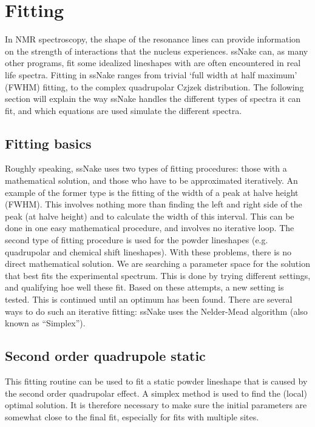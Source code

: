 \documentclass[11pt,a4paper]{article}
\begin{document}
\section{Fitting}
In NMR spectroscopy, the shape of the resonance lines can provide information on the strength of interactions that the nucleus experiences. ssNake can, as many other programs, fit some idealized lineshapes with are often encountered in real life spectra. Fitting in ssNake ranges from trivial `full width at half maximum' (FWHM) fitting, to the complex quadrupolar Czjzek distribution. The following section will explain the way ssNake handles the different types of spectra it can fit, and which equations are used simulate the different spectra.

\subsection{Fitting basics}
Roughly speaking, ssNake uses two types of fitting procedures: those with a mathematical solution, and those who have to be approximated iteratively. An example of the former type is the fitting of the width of a peak at halve height (FWHM). This involves nothing more than finding the left and right side of the peak (at halve height) and to calculate the width of this interval. This can be done in one easy mathematical procedure, and involves no iterative loop. The second type of fitting procedure is used for the powder lineshapes (e.g. quadrupolar and chemical shift lineshapes). With these problems, there is no direct mathematical solution. We are searching a parameter space for the solution that best fits the experimental spectrum. This is done by trying different settings, and qualifying hoe well these fit. Based on these attempts, a new setting is tested. This is continued until an optimum has been found. There are several ways to do such an iterative fitting: ssNake uses the Nelder-Mead algorithm \cite{nelder1965simplex} (also known as ``Simplex'').







\subsection{Second order quadrupole static}
This fitting routine can be used to fit a static powder lineshape that is caused by the second order quadrupolar effect. A simplex method is used to find the (local) optimal solution. It is therefore necessary to make sure the initial parameters are somewhat close to the final fit, especially for fits with multiple sites.
\end{document}

